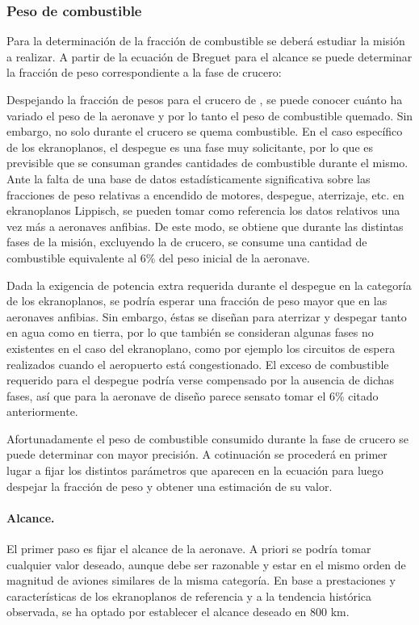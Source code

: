 \subsubsection{Peso de combustible}
\label{sec:design:weights:fuel}

Para la determinación de la fracción de combustible se deberá estudiar la misión a realizar. A partir de la ecuación de Breguet para el alcance se puede determinar la fracción de peso correspondiente a la fase de crucero:

Despejando la fracción de pesos para el crucero de , se puede conocer cuánto ha variado el peso de la aeronave y por lo tanto el peso de combustible quemado. Sin embargo, no solo durante el crucero se quema combustible. En el caso específico de los ekranoplanos, el despegue es una fase muy solicitante, por lo que es previsible que se consuman grandes cantidades de combustible durante el mismo. Ante la falta de una base de datos estadísticamente significativa sobre las fracciones de peso relativas a encendido de motores, despegue, aterrizaje, etc. en ekranoplanos Lippisch, se pueden tomar como referencia los datos relativos una vez más a aeronaves anfibias. De este modo, se obtiene \cite{ref:roskam} que durante las distintas fases de la misión, excluyendo la de crucero, se consume una cantidad de combustible equivalente al 6\% del peso inicial de la aeronave.

Dada la exigencia de potencia extra requerida durante el despegue en la categoría de los ekranoplanos, se podría esperar una fracción de peso mayor que en las aeronaves anfibias. Sin embargo, éstas se diseñan para aterrizar y despegar tanto en agua como en tierra, por lo que también se consideran algunas fases no existentes en el caso del ekranoplano, como por ejemplo los circuitos de espera realizados cuando el aeropuerto está congestionado. El exceso de combustible requerido para el despegue podría verse compensado por la ausencia de dichas fases, así que para la aeronave de diseño parece sensato tomar el 6\% citado anteriormente.

Afortunadamente el peso de combustible consumido durante la fase de crucero se puede determinar con mayor precisión. A cotinuación se procederá en primer lugar a fijar los distintos parámetros que aparecen en la ecuación  para luego despejar la fracción de peso y obtener una estimación de su valor.

\paragraph{Alcance.} El primer paso es fijar el alcance de la aeronave. A priori se podría tomar cualquier valor deseado, aunque debe ser razonable y estar en el mismo orden de magnitud de aviones similares de la misma categoría. En base a prestaciones y características de los ekranoplanos de referencia y a la tendencia histórica observada, se ha optado por establecer el alcance deseado en 800 km.

